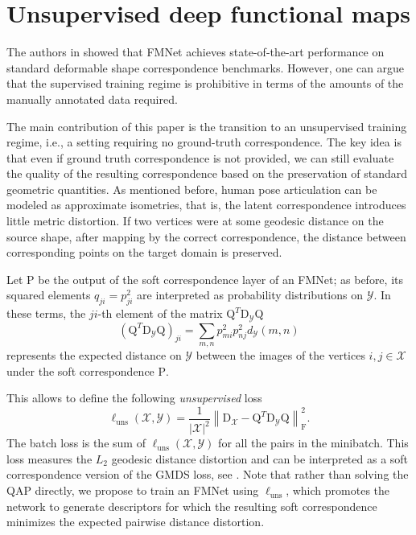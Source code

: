 \documentclass[10pt,twocolumn,letterpaper]{article}
\newcommand\comment[1]{{}}
\newcommand{\norm}[1]{\left\lVert#1\right\rVert}
\newcommand{\bb}[1]{\bm{\mathrm{#1}}}
\begin{document}
\section{Unsupervised deep functional maps}
The authors in \cite{litany2017deep} showed that FMNet achieves state-of-the-art performance on standard deformable shape correspondence benchmarks. 
However, one can argue that the supervised training regime is prohibitive in terms of the amounts of the manually annotated data required.
\comment{Even when pairs of shapes with dense ground truth correspondence come from an automatic alignment process, such as in the FAUST dataset \cite{faust}, it introduces modeling bias -- in the case of FAUST, it is the common connectivity of the fitted model. }

The main contribution of this paper is the transition to an unsupervised training regime, i.e., a setting requiring no ground-truth correspondence. 
The key idea is that even if ground truth correspondence is not provided, we can still evaluate the quality of the resulting correspondence based on the preservation of standard geometric quantities.
As mentioned before, human pose articulation can be modeled as approximate isometries, that is, the latent correspondence introduces little metric distortion. 
If two vertices were at some geodesic distance on the source shape, after mapping by the correct correspondence, the distance between corresponding points on the target domain is preserved. 

Let $\bb{P}$ be the output of the soft correspondence layer of an FMNet; as before, its squared elements $q_{ji} = p_{ji}^2$ are interpreted as probability distributions on $\mathcal{Y}$. In these terms, the $ji$-th element of the matrix $\bb{Q}^T \bb{D}_{\mathcal{Y}} \bb{Q}$ 
\begin{equation}
    (\bb{Q}^T \bb{D}_{\mathcal{Y}} \bb{Q})_{ji} = \sum_{m,n} p_{mi}^2 p_{nj}^2 d_{\mathcal{Y}}(m,n) 
\end{equation}
represents the expected distance on $\mathcal{Y}$ between the images of the vertices $i,j \in \mathcal{X}$ under the soft correspondence $\bb{P}$. 

This allows to define the following \emph{unsupervised} loss
\begin{equation}
    \label{unsupervised_loss}
    \ell_{\mathrm{uns}} (\mathcal{X},\mathcal{Y}) =\frac{1}{|\mathcal{X}|^2}  \norm{\bb{D}_{\mathcal{X}} - \bb{Q}^T \bb{D}_{\mathcal{Y}} \bb{Q}   }^2_{\mathrm{F}}.
\end{equation}
 The batch loss is the sum of $\ell_{\mathrm{uns}}(\mathcal{X},\mathcal{Y})$ for all the pairs in the minibatch. 
This loss measures the $L_2$ geodesic distance distortion and can be interpreted as a soft correspondence version of the GMDS loss, see  \cite{aflalo2016spectral}.
Note that rather than solving the QAP directly, we propose to train an FMNet using $\ell_{\mathrm{uns}}$, which promotes the network to generate descriptors for which the resulting soft correspondence minimizes the expected pairwise distance distortion.  
\end{document}
